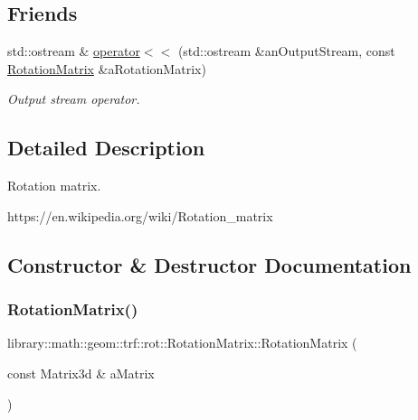 \subsection*{Friends}
\begin{DoxyCompactItemize}
\item 
std\+::ostream \& \hyperlink{classlibrary_1_1math_1_1geom_1_1trf_1_1rot_1_1_rotation_matrix_aa9ed0897a6219331deeb7750017a0df9}{operator$<$$<$} (std\+::ostream \&an\+Output\+Stream, const \hyperlink{classlibrary_1_1math_1_1geom_1_1trf_1_1rot_1_1_rotation_matrix}{Rotation\+Matrix} \&a\+Rotation\+Matrix)
\begin{DoxyCompactList}\small\item\em Output stream operator. \end{DoxyCompactList}\end{DoxyCompactItemize}


\subsection{Detailed Description}
Rotation matrix. 

https\+://en.wikipedia.\+org/wiki/\+Rotation\+\_\+matrix 

\subsection{Constructor \& Destructor Documentation}
\mbox{\label{classlibrary_1_1math_1_1geom_1_1trf_1_1rot_1_1_rotation_matrix_a667d2c05aa5b0cc88775938d11164cdc}} 
\subsubsection{\texorpdfstring{Rotation\+Matrix()}{RotationMatrix()}}
{\footnotesize\ttfamily library\+::math\+::geom\+::trf\+::rot\+::\+Rotation\+Matrix\+::\+Rotation\+Matrix (\begin{DoxyParamCaption}\item[{const Matrix3d \&}]{a\+Matrix }\end{DoxyParamCaption})}



